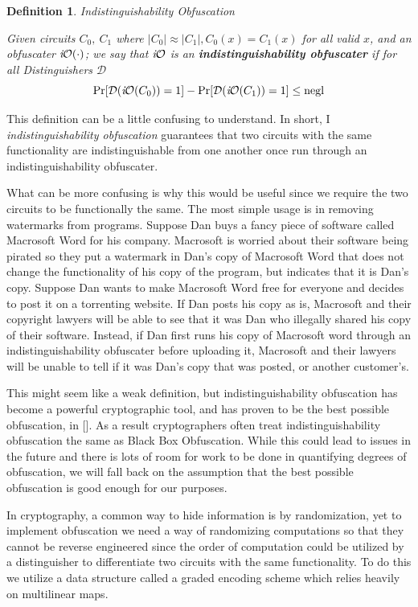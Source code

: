 \documentclass[12pt,twoside]{reedthesis}
\newtheorem{definition}{Definition}
\begin{document}
    \begin{definition}{Indistinguishability Obfuscation}
    \par Given circuits $C_0,\ C_1$ where $|C_0| \approx |C_1|, C_0(x) = C_1(x)$ for all valid $x$, and an obfuscater $\textit{i}\mathcal{O}(\cdot)$; we say that $\textit{i}\mathcal{O}$ is an \textbf{indistinguishability obfuscater} if for all Distinguishers $\mathcal{D}$
    $$\Pr[\mathcal{D}(\textit{i}\mathcal{O}(C_0)) = 1] -\Pr[\mathcal{D}(\textit{i}\mathcal{O}(C_1)) = 1] \leq \text{negl}$$
    \end{definition}
    
    \par This definition can be a little confusing to understand. In short, I \textit{indistinguishability obfuscation} guarantees that two circuits with the same functionality are indistinguishable from one another once run through an indistinguishability obfuscater. 
    \par What can be more confusing is why this would be useful since we require the two circuits to be functionally the same. The most simple usage is in removing watermarks from programs. Suppose Dan buys a fancy piece of software called Macrosoft Word for his company. Macrosoft is worried about their software being pirated so they put a watermark in Dan's copy of Macrosoft Word that does not change the functionality of his copy of the program, but indicates that it is Dan's copy. Suppose Dan wants to make Macrosoft Word free for everyone and decides to post it on a torrenting website. If Dan posts his copy as is, Macrosoft and their copyright lawyers will be able to see that it was Dan who illegally shared his copy of their software. Instead, if Dan first runs his copy of Macrosoft word through an indistinguishability obfuscater before uploading it, Macrosoft and their lawyers will be unable to tell if it was Dan's copy that was posted, or another customer's.
    \par This might seem like a weak definition, but indistinguishability obfuscation has become a powerful cryptographic tool, and has proven to be the best possible obfuscation, in [\cite{Goldwasser:2007:BO:1760749.1760765}]. As a result cryptographers often treat indistinguishability obfuscation the same as Black Box Obfuscation. While this could lead to issues in the future and there is lots of room for work to be done in quantifying degrees of obfuscation, we will fall back on the assumption that the best possible obfuscation is good enough for our purposes.
    \par In cryptography, a common way to hide information is by randomization, yet to implement obfuscation we need a way of randomizing computations so that they cannot be reverse engineered since the order of computation could be utilized by a distinguisher to differentiate two circuits with the same functionality. To do this we utilize a data  structure called a graded encoding scheme which relies heavily on multilinear maps. 
    
\end{document}

